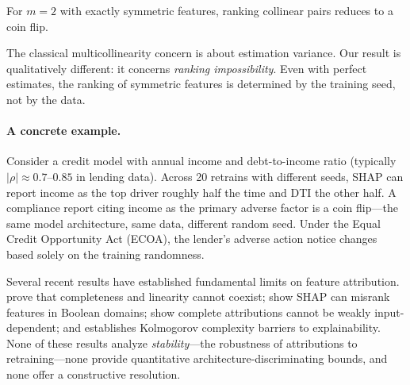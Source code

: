 \documentclass{jmlr}
\begin{document}
For $m{=}2$ with exactly symmetric features, ranking collinear pairs reduces to a coin flip.

The classical multicollinearity concern is about estimation variance. Our result is qualitatively different: it concerns \emph{ranking impossibility}. Even with perfect estimates, the ranking of symmetric features is determined by the training seed, not by the data.

\paragraph{A concrete example.}
Consider a credit model with annual income and debt-to-income ratio
(typically $|\rho| \approx 0.7$--$0.85$ in lending data). Across 20 retrains with different seeds, SHAP
can report income as the top driver roughly half the time and DTI the other half.
A compliance report citing income as the primary adverse factor
is a coin flip---the same model architecture, same data, different
random seed. Under the Equal Credit Opportunity Act (ECOA), the lender's adverse action notice
changes based solely on the training randomness.

Several recent results have established fundamental limits on feature attribution.
\citet{bilodeau2024impossibility} prove that completeness and linearity cannot coexist; \citet{huang2024failings} show SHAP can misrank features in Boolean domains; \citet{srinivas2019full} show complete attributions cannot be weakly input-dependent; and \citet{rao2025limits} establishes Kolmogorov complexity barriers to explainability.
None of these results analyze \emph{stability}---the robustness of attributions to retraining---none provide quantitative architecture-discriminating bounds, and none offer a constructive resolution.
\end{document}
